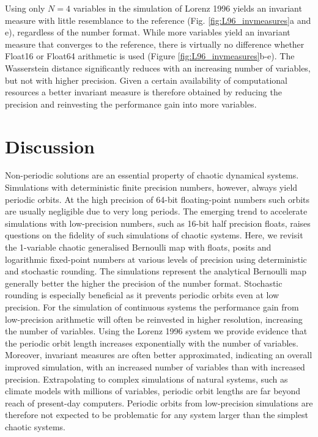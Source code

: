 Using only $N=4$ variables in the simulation of Lorenz 1996 yields an invariant measure with little resemblance to the reference (Fig.
\ref{fig:L96_invmeasures}a and e), regardless of the number format. While more variables yield an invariant measure that converges
to the reference, there is virtually no difference whether Float16 or Float64 arithmetic is used (Figure \ref{fig:L96_invmeasures}b-e).
The Wasserstein distance significantly reduces with an increasing number of variables, but not with higher precision. Given a certain
availability of computational resources a better invariant measure is therefore obtained by reducing the precision and reinvesting the
performance gain into more variables.

\section{Discussion}

Non-periodic solutions are an essential property of chaotic dynamical systems. Simulations with deterministic
finite precision numbers, however, always yield periodic orbits. At the high precision of 64-bit floating-point numbers
such orbits are usually negligible due to very long periods. The emerging trend to accelerate simulations with
low-precision numbers, such as 16-bit half precision floats, raises questions on the fidelity of such simulations
of chaotic systems. Here, we revisit the 1-variable chaotic generalised Bernoulli map with floats, posits and
logarithmic fixed-point numbers at various levels of precision using deterministic and stochastic rounding.
The simulations represent the analytical Bernoulli map generally better the higher the precision of the number format.
Stochastic rounding is especially beneficial as it prevents periodic orbits even at low precision. For the simulation
of continuous systems the performance gain from low-precision arithmetic will often be reinvested in higher resolution,
increasing the number of variables. Using the Lorenz 1996 system we provide evidence that the periodic orbit
length increases exponentially with the number of variables. Moreover, invariant measures are often better
approximated, indicating an overall improved simulation, with an increased number of variables than with
increased precision. Extrapolating to complex simulations of natural systems, such as climate models with
millions of variables, periodic orbit lengths are far beyond reach of present-day computers. Periodic orbits from
low-precision simulations are therefore not expected to be problematic for any system larger than the simplest
chaotic systems.
